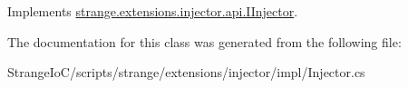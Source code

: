 Implements \hyperlink{interfacestrange_1_1extensions_1_1injector_1_1api_1_1_i_injector_ab6c185a183b27708e38c4954195fe591}{strange.\-extensions.\-injector.\-api.\-I\-Injector}.



The documentation for this class was generated from the following file\-:\begin{DoxyCompactItemize}
\item 
Strange\-Io\-C/scripts/strange/extensions/injector/impl/Injector.\-cs\end{DoxyCompactItemize}
